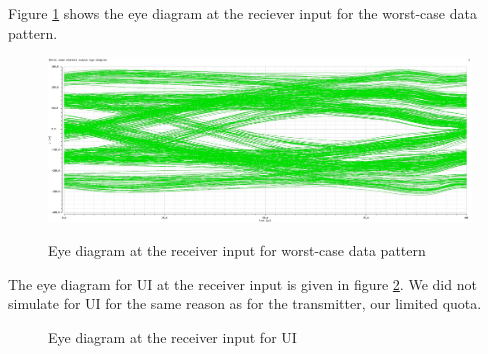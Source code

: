 Figure \ref{fig:rx_inp_wc_eye} shows the eye diagram at the reciever input for the worst-case data pattern.

\begin{figure}[H]
  \centering
  {\includegraphics[scale=0.33]{img/wc_ch_eye.jpg}}
  \caption{Eye diagram at the receiver input for worst-case data pattern}
  \label{fig:rx_inp_wc_eye}
\end{figure}


The eye diagram for \unit[5000]{UI} at the receiver input is given in figure \ref{fig:rx_out_eye}. We did not simulate for \unit[10000]{UI} for the same reason as for the transmitter, our limited quota.

\begin{figure}[H]
  \centering
  \caption{Eye diagram at the receiver input for \unit[5000]{UI}}
  \label{fig:rx_out_eye}
\end{figure}